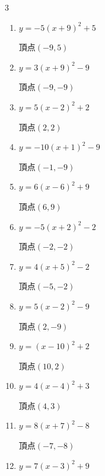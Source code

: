 \begin{multicols}{3}
\begin{enumerate}
\columnbreak %

  \item $\displaystyle y=-5\left( x+9\right)^{2}+5$

        $\displaystyle 頂点\left( -9 , 5 \right)$

  \item $\displaystyle y=3\left( x+9\right)^{2}-9$

        $\displaystyle 頂点\left( -9 , -9 \right)$

  \item $\displaystyle y=5\left( x-2\right)^{2}+2$

        $\displaystyle 頂点\left( 2 , 2 \right)$

  \item $\displaystyle y=-10\left( x+1\right)^{2}-9$

        $\displaystyle 頂点\left( -1 , -9 \right)$

  \item $\displaystyle y=6\left( x-6\right)^{2}+9$

        $\displaystyle 頂点\left( 6 , 9 \right)$

  \item $\displaystyle y=-5\left( x+2\right)^{2}-2$

        $\displaystyle 頂点\left( -2 , -2 \right)$

  \item $\displaystyle y=4\left( x+5\right)^{2}-2$

        $\displaystyle 頂点\left( -5 , -2 \right)$

  \item $\displaystyle y=5\left( x-2\right)^{2}-9$

        $\displaystyle 頂点\left( 2 , -9 \right)$

  \item $\displaystyle y=\left( x-10\right)^{2}+2$

        $\displaystyle 頂点\left( 10 , 2 \right)$

  \item $\displaystyle y=4\left( x-4\right)^{2}+3$

        $\displaystyle 頂点\left( 4 , 3 \right)$

  \item $\displaystyle y=8\left( x+7\right)^{2}-8$

        $\displaystyle 頂点\left( -7 , -8 \right)$

  \item $\displaystyle y=7\left( x-3\right)^{2}+9$


\end{enumerate}
\end{multicols}
